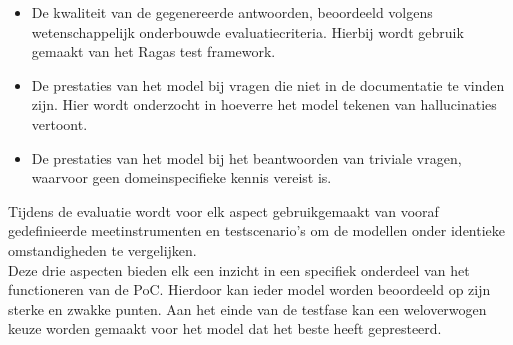\begin{itemize}
    \item De kwaliteit van de gegenereerde antwoorden, beoordeeld volgens wetenschappelijk onderbouwde evaluatiecriteria. Hierbij wordt gebruik gemaakt van het Ragas test framework.
    \item De prestaties van het model bij vragen die niet in de documentatie te vinden zijn. Hier wordt onderzocht in hoeverre het model tekenen van hallucinaties vertoont.
    \item De prestaties van het model bij het beantwoorden van triviale vragen, waarvoor geen domeinspecifieke kennis vereist is.
\end{itemize}

Tijdens de evaluatie wordt voor elk aspect gebruikgemaakt van vooraf gedefinieerde meetinstrumenten en testscenario’s om de modellen onder identieke omstandigheden te vergelijken.
\\[1em]
Deze drie aspecten bieden elk een inzicht in een specifiek onderdeel van het functioneren van de PoC. Hierdoor kan ieder model worden beoordeeld op zijn sterke en zwakke punten. Aan het einde van de testfase kan een weloverwogen keuze worden gemaakt voor het model dat het beste heeft gepresteerd.

